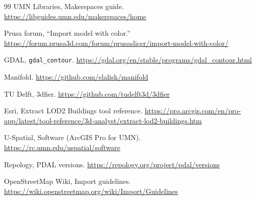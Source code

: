 \documentclass[11pt,letterpaper]{article}
\begin{document}
\begin{thebibliography}{99}
 UMN Libraries, Makerspaces guide. \url{https://libguides.umn.edu/makerspaces/home}

 Prusa forum, ``Import model with color.'' \url{https://forum.prusa3d.com/forum/prusaslicer/import-model-with-color/}

 GDAL, \texttt{gdal\_contour}. \url{https://gdal.org/en/stable/programs/gdal_contour.html}

 Manifold. \url{https://github.com/elalish/manifold}

 TU Delft, 3dfier. \url{https://github.com/tudelft3d/3dfier}

 Esri, Extract LOD2 Buildings tool reference. \url{https://pro.arcgis.com/en/pro-app/latest/tool-reference/3d-analyst/extract-lod2-buildings.htm}

 U-Spatial, Software (ArcGIS Pro for UMN). \url{https://rc.umn.edu/uspatial/software}

 Repology, PDAL versions. \url{https://repology.org/project/pdal/versions}

 OpenStreetMap Wiki, Import guidelines. \url{https://wiki.openstreetmap.org/wiki/Import/Guidelines}

\end{thebibliography}
\end{document}
